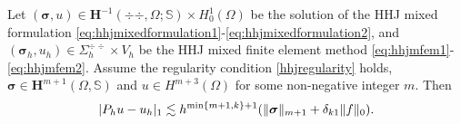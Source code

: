 \begin{theorem}
Let $(\boldsymbol{\sigma} , u)\in \boldsymbol{H}^{-1}(\div\div,\Omega; \mathbb{S})\times H_0^1(\Omega)$ be the solution of the HHJ mixed formulation \eqref{eq:hhjmixedformulation1}-\eqref{eq:hhjmixedformulation2}, and $(\boldsymbol{\sigma}_h, u_h)\in \Sigma_h^{\div\div}\times V_h$ be the HHJ mixed finite element method \eqref{eq:hhjmfem1}-\eqref{eq:hhjmfem2}.
Assume the regularity condition \eqref{hhjregularity} holds, $\boldsymbol{\sigma}\in \boldsymbol{H}^{m+1}(\Omega, \mathbb{S})$ and $u\in H^{m+3}(\Omega)$ for
some non-negative integer $m$.
Then
\begin{equation}\label{eq:hhjH1supererror}
|P_hu-u_h|_{1}\lesssim h^{\min\{m+1,k\}+1}(\|\bs\sigma\|_{m+1}+\delta_{k1}\|f\|_0).%
\end{equation}
\end{theorem}
